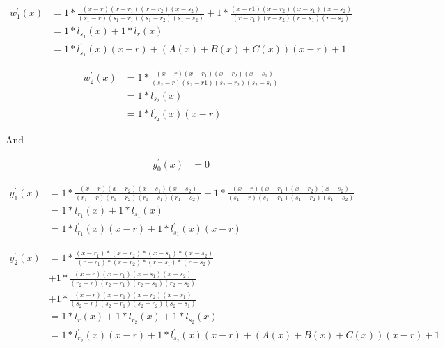 \documentclass{article}
\begin{document}
\begin{align*}
    w^{'}_{1}(x) &= 1 * \frac{(x  -  r) (x  - r_{1}) (x  - r_{2}) (x  - s_{2})}{(s_{1} -  r) (s_{1} - r_{1}) (s_{1} - r_{2}) (s_{1} - s_{2})} + 1 * \frac{(x  - r1) (x  - r_{2}) (x  - s_{1}) (x  - s_{2})}{(r  - r_{1}) (r  - r_{2}) (r  - s_{1}) (r  - s_{2})} \\
    &= 1 * l_{s_{1}}(x) + 1 * l_{r}(x) \\
    &= 1 * l^{'}_{s_{1}}(x) (x - r) + (A(x) + B(x) + C(x)) (x - r) + 1
\end{align*}

\begin{align*}
    w^{'}_{2}(x) &= 1 * \frac{(x  -  r) (x  - r_{1}) (x  - r_{2}) (x  - s_{1})}{(s_{2} -  r) (s_{2} - r1) (s_{2} - r_{2}) (s_{2} - s_{1})} \\
    &= 1 * l_{s_{2}}(x) \\
    &= 1 * l^{'}_{s_{2}}(x) (x - r)
\end{align*}

\noindent And

\begin{align*}
    y^{'}_{0}(x) &= 0
\end{align*}

\begin{align*}
    y^{'}_{1}(x) &= 1 * \frac{(x  -  r) (x  - r_{2}) (x  - s_{1}) (x  - s_{2})}{(r_{1} -  r) (r_{1} - r_{2}) (r_{1} - s_{1}) (r_{1} - s_{2})} + 1 * \frac{(x  -  r) (x  - r_{1}) (x  - r_{2}) (x  - s_{2})}{(s_{1} -  r) (s_{1} - r_{1}) (s_{1} - r_{2}) (s_{1} - s_{2})} \\
    &= 1 * l_{r_{1}}(x) + 1 * l_{s_{1}}(x) \\
    &= 1 * l^{'}_{r_{1}}(x) (x - r) + 1 * l^{'}_{s_{1}}(x) (x - r)
\end{align*}

\begin{align*}
    y^{'}_{2}(x) &= 1 * \frac{(x  - r_{1}) * (x  - r_{2}) * (x  - s_{1}) * (x  - s_{2})}{(r  - r_{1}) * (r  - r_{2}) * (r  - s_{1}) * (r  - s_{2})} \\
    &+ 1 * \frac{(x  -  r) (x  - r_{1}) (x  - s_{1}) (x  - s_{2})}{(r_{2} -  r) (r_{2} - r_{1}) (r_{2} - s_{1}) (r_{2} - s_{2})} \\
    &+ 1 * \frac{(x  -  r) (x  - r_{1}) (x  - r_{2}) (x  - s_{1})}{(s_{2} -  r) (s_{2} - r_{1}) (s_{2} - r_{2}) (s_{2} - s_{1})} \\
    &= 1 * l_{r}(x) + 1 * l_{r_{2}}(x) + 1 * l_{s_{2}}(x) \\
    &= 1 * l^{'}_{r_{2}}(x) (x - r) + 1 * l^{'}_{s_{2}}(x) (x - r) + (A(x) + B(x) + C(x)) (x - r) + 1
\end{align*}
\end{document}
